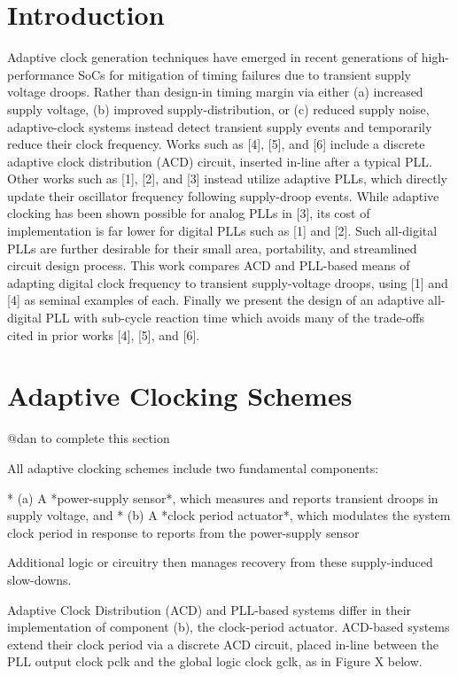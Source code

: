 \documentclass{IEEEtran}
\begin{document}
\section{Introduction}

Adaptive clock generation techniques have emerged in recent generations of high-performance SoCs for mitigation of timing failures due to transient supply voltage droops. Rather than design-in timing margin via either (a) increased supply voltage, (b) improved supply-distribution, or (c) reduced supply noise, adaptive-clock systems instead detect transient supply events and temporarily reduce their clock frequency. Works such as [4], [5], and [6] include a discrete adaptive clock distribution (ACD) circuit, inserted in-line after a typical PLL. Other works such as [1], [2], and [3] instead utilize adaptive PLLs, which directly update their oscillator frequency following supply-droop events. While adaptive clocking has been shown possible for analog PLLs in [3], its cost of implementation is far lower for digital PLLs such as [1] and [2]. Such all-digital PLLs are further desirable for their small area, portability, and streamlined circuit design process. This work compares ACD and PLL-based means of adapting digital clock frequency to transient supply-voltage droops, using [1] and [4] as seminal examples of each. Finally we present the design of an adaptive all-digital PLL with sub-cycle reaction time which avoids many of the trade-offs cited in prior works [4], [5], and [6].

\section{Adaptive Clocking Schemes}

@dan to complete this section

All adaptive clocking schemes include two fundamental components:

* (a) A *power-supply sensor*, which measures and reports transient droops in supply voltage, and
* (b) A *clock period actuator*, which modulates the system clock period in response to reports from the power-supply sensor

Additional logic or circuitry then manages recovery from these supply-induced slow-downs. 

Adaptive Clock Distribution (ACD) and PLL-based systems differ in their implementation of component (b), the clock-period actuator. ACD-based systems extend their clock period via a discrete ACD circuit, placed in-line between the PLL output clock pclk and the global logic clock gclk, as in Figure X below.
\end{document}
